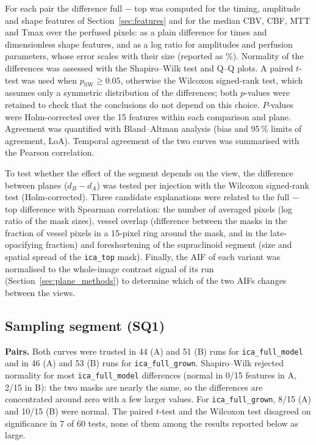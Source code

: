 For each pair the difference full $-$ top was computed for the timing, amplitude and shape features of
Section~\ref{sec:features} and for the median CBV, CBF, MTT and Tmax over the perfused pixels: as a plain
difference for times and dimensionless shape features, and as a log ratio for amplitudes and perfusion
parameters, whose error scales with their size (reported as \%). Normality of the differences was assessed with
the Shapiro--Wilk test and Q--Q plots. A paired $t$-test was used when $p_\mathrm{SW} \geq 0.05$, otherwise the
Wilcoxon signed-rank test, which assumes only a symmetric distribution of the differences; both $p$-values were
retained to check that the conclusions do not depend on this choice. $P$-values were Holm-corrected over the 15
features within each comparison and plane. Agreement was quantified with Bland--Altman analysis (bias and 95\,\%
limits of agreement, LoA). Temporal agreement of the two curves was summarised with the Pearson correlation.

To test whether the effect of the segment depends on the view, the difference between planes ($d_B - d_A$) was
tested per injection with the Wilcoxon signed-rank test (Holm-corrected). Three candidate explanations were
related to the full $-$ top difference with Spearman correlation: the number of averaged pixels (log ratio of the
mask sizes), vessel overlap (difference between the masks in the fraction of vessel pixels in a 15-pixel ring
around the mask, and in the late-opacifying fraction) and foreshortening of the supraclinoid segment (size and
spatial spread of the \texttt{ica\_top} mask). Finally, the AIF of each variant was normalised to the whole-image
contrast signal of its run (Section~\ref{sec:plane_methods}) to determine which of the two AIFs changes between
the views.

\subsection{Sampling segment (SQ1)}
\label{sec:sq1_results}

\textbf{Pairs.} Both curves were trusted in 44 (A) and 51 (B) runs for \texttt{ica\_full\_model} and in 46 (A)
and 53 (B) runs for \texttt{ica\_full\_grown}. Shapiro--Wilk rejected normality for most
\texttt{ica\_full\_model} differences (normal in 0/15 features in A, 2/15 in B): the two masks are nearly the
same, so the differences are concentrated around zero with a few larger values. For \texttt{ica\_full\_grown},
8/15 (A) and 10/15 (B) were normal. The paired $t$-test and the Wilcoxon test disagreed on significance in
7 of 60 tests, none of them among the results reported below as large.


